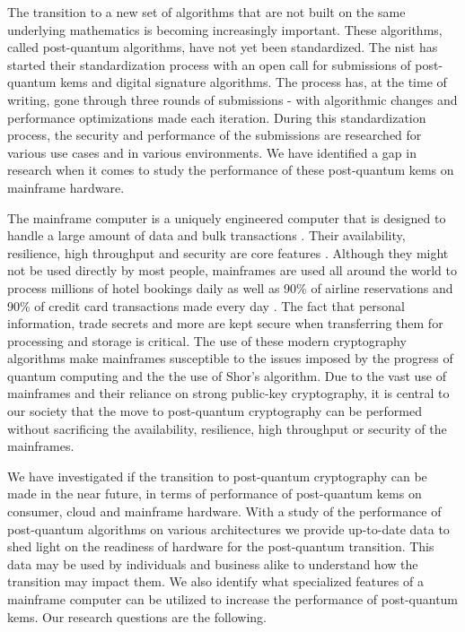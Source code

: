 The transition to a new set of algorithms that are not built on the same underlying mathematics is becoming increasingly important. These algorithms, called \gls{post-quantum} algorithms, have not yet been standardized. The \acrfull{nist} has started their standardization process with an open call for submissions of \gls{post-quantum} \glspl{kem} and digital signature algorithms. The process has, at the time of writing, gone through three rounds of submissions - with algorithmic changes and performance optimizations made each iteration. During this standardization process, the security and performance of the submissions are researched for various use cases and in various environments. We have identified a gap in research when it comes to study the performance of these \gls{post-quantum} \glspl{kem} on mainframe hardware.

The mainframe computer is a uniquely engineered computer that is designed to handle a large amount of data and bulk transactions \cite{mainframes}. Their availability, resilience, high throughput and security are core features \cite{mainframes}. Although they might not be used directly by most people, mainframes are used all around the world to process millions of hotel bookings daily as well as 90\% of airline reservations and 90\% of credit card transactions made every day \cite{jacobi2020}. The fact that personal information, trade secrets and more are kept secure when transferring them for processing and storage is critical. The use of these modern cryptography algorithms make mainframes susceptible to the issues imposed by the progress of quantum computing and the the use of Shor's algorithm. Due to the vast use of mainframes and their reliance on strong public-key cryptography, it is central to our society that the move to \gls{post-quantum} cryptography can be performed without sacrificing the availability, resilience, high throughput or security of the mainframes.

We have investigated if the transition to \gls{post-quantum} cryptography can be made in the near future, in terms of performance of \gls{post-quantum} \glspl{kem} on consumer, cloud and mainframe hardware. With a study of the performance of \gls{post-quantum} algorithms on various architectures we provide up-to-date data to shed light on the readiness of hardware for the \gls{post-quantum} transition. This data may be used by individuals and business alike to understand how the transition may impact them. We also identify what specialized features of a mainframe computer can be utilized to increase the performance of \gls{post-quantum} \glspl{kem}. Our research questions are the following.


